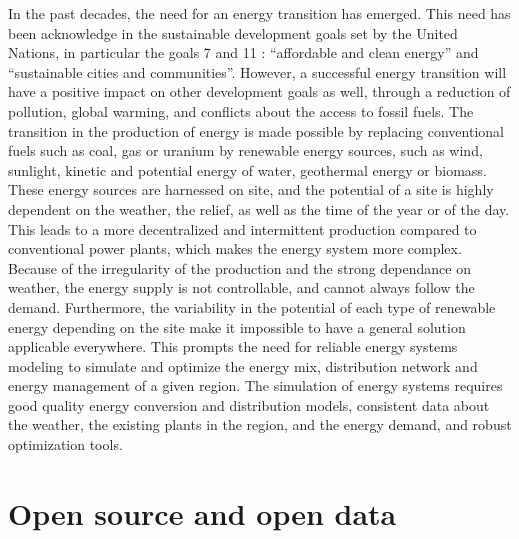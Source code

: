 In the past decades, the need for an energy transition has emerged. This need has been acknowledge in the sustainable development goals \cite{un_sdgs} set by the United Nations, in particular the goals 7 \cite{un_sdg7} and 11 \cite{un_sdg11} : ``affordable and clean energy'' and ``sustainable cities and communities''. However, a successful energy transition will have a positive impact on other development goals as well, through a reduction of pollution, global warming, and conflicts about the access to fossil fuels. \newline
The transition in the production of energy is made possible by replacing conventional fuels such as coal, gas or uranium by renewable energy sources, such as wind, sunlight, kinetic and potential energy of water, geothermal energy or biomass. These energy sources are harnessed on site, and the potential of a site is highly dependent on the weather, the relief, as well as the time of the year or of the day. This leads to a more decentralized and intermittent production compared to conventional power plants, which makes the energy system more complex. \newline
Because of the irregularity of the production and the strong dependance on weather, the energy supply is not controllable, and cannot always follow the demand. Furthermore, the variability in the potential of each type of renewable energy depending on the site make it impossible to have a general solution applicable everywhere. This prompts the need for reliable energy systems modeling to simulate and optimize the energy mix, distribution network and energy management of a given region. The simulation of energy systems requires good quality energy conversion and distribution models, consistent data about the weather, the existing plants in the region, and the energy demand, and robust optimization tools.


\section{Open source and open data}

